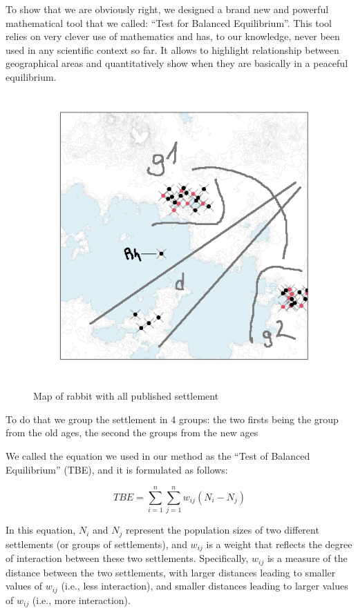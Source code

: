 \documentclass[10pt]{paper}
\begin{document}
\pagebreak


To show that we are obviously right, we designed a brand new and powerful mathematical tool that we called: ``Test for Balanced Equilibrium''. This tool relies on very clever use of mathematics and has, to our knowledge, never been used in any scientific context so far. It allows to highlight relationship between geographical areas and quantitatively show when they are basically in a peaceful equilibrium.

\begin{figure}[hbp]

    \centering
    \includegraphics[width=.65\textwidth]{all_gpe.png}
    \caption{Map of rabbit with all published settlement}
    \label{fig:newage}
\end{figure}


To do that we group the settlement in 4 groups: the two firsts being the group from the old ages, the second the groups from the new ages 



We called the equation we used in our method as the ``Test of Balanced Equilibrium'' (TBE), and it is formulated as follows:

\begin{equation}
    TBE = \sum_{i=1}^{n} \sum_{j=1}^{n} w_{ij} (N_i - N_j)
\end{equation}

In this equation, $N_i$ and $N_j$ represent the population sizes of two different settlements (or groups of settlements), and $w_{ij}$ is a weight that reflects the degree of interaction between these two settlements. Specifically, $w_{ij}$ is a measure of the distance between the two settlements, with larger distances leading to smaller values of $w_{ij}$ (i.e., less interaction), and smaller distances leading to larger values of $w_{ij}$ (i.e., more interaction).
\end{document}
